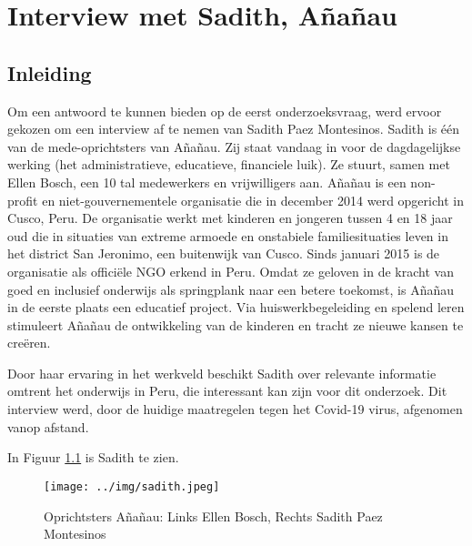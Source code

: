 
\chapter{Interview met Sadith, Añañau}
\label{ch:interviewSadith}

\section{Inleiding}
Om een antwoord te kunnen bieden op de eerst onderzoeksvraag, werd ervoor gekozen om een interview af te nemen van Sadith Paez Montesinos. Sadith is één van de mede-oprichtsters van Añañau. Zij staat vandaag in voor de dagdagelijkse werking (het administratieve, educatieve, financiele luik). Ze stuurt, samen met Ellen Bosch, een 10 tal medewerkers en vrijwilligers aan. Añañau is een non-profit en niet-gouvernementele organisatie die in december 2014 werd opgericht in Cusco, Peru. De organisatie werkt met kinderen en jongeren tussen 4 en 18 jaar oud die in situaties van extreme armoede en onstabiele familiesituaties leven in het district San Jeronimo, een buitenwijk van Cusco. Sinds januari 2015 is de organisatie als officiële NGO erkend in Peru. Omdat ze geloven in de kracht van goed en inclusief onderwijs als springplank naar een betere toekomst, is Añañau in de eerste plaats een educatief project. Via huiswerkbegeleiding en spelend leren stimuleert Añañau de ontwikkeling van de kinderen en tracht ze nieuwe kansen te creëren. \autocite{Ananau2020}

Door haar ervaring in het werkveld beschikt Sadith over relevante informatie omtrent het onderwijs in Peru, die interessant kan zijn voor dit onderzoek. Dit interview werd, door de huidige maatregelen tegen het Covid-19 virus, afgenomen vanop afstand.

In Figuur \ref{sadith} is Sadith te zien.

 \begin{figure}[h!]
	\texttt{[image: ../img/sadith.jpeg]}
	\caption{Oprichtsters Añañau: Links Ellen Bosch, Rechts Sadith Paez Montesinos} \autocite{Ananau2020}
	\label{sadith}
\end{figure}

